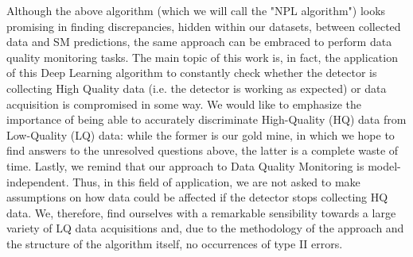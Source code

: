 Although the above algorithm (which we will call the "NPL algorithm") looks promising in finding discrepancies, hidden
within our datasets, between collected data and SM predictions, the same approach can be embraced to perform data
quality monitoring tasks. The main topic of this work is, in fact, the application of this Deep Learning algorithm to
constantly check whether the detector is collecting High Quality data (i.e. the detector is working as expected) or data
acquisition is compromised in some way. We would like to emphasize the importance of being able to accurately
discriminate High-Quality (HQ) data from Low-Quality (LQ) data: while the former is our gold mine, in which we hope to
find answers to the unresolved questions above, the latter is a complete waste of time. Lastly, we remind that our
approach to Data Quality Monitoring is model-independent. Thus, in this field of application, we are not asked to make
assumptions on how data could be affected if the detector stops collecting HQ data. We, therefore, find ourselves with a
remarkable sensibility towards a large variety of LQ data acquisitions and, due to the methodology of the approach and
the structure of the algorithm itself, no occurrences of type II errors.